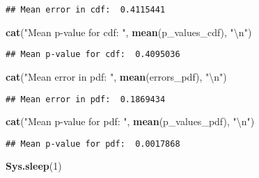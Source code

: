 \documentclass[
]{article}
\newenvironment{Shaded}{\begin{snugshade}}{\end{snugshade}}
\newcommand{\CharTok}[1]{\textcolor[rgb]{0.31,0.60,0.02}{#1}}
\newcommand{\DecValTok}[1]{\textcolor[rgb]{0.00,0.00,0.81}{#1}}
\newcommand{\KeywordTok}[1]{\textcolor[rgb]{0.13,0.29,0.53}{\textbf{#1}}}
\newcommand{\NormalTok}[1]{#1}
\newcommand{\StringTok}[1]{\textcolor[rgb]{0.31,0.60,0.02}{#1}}
\begin{document}
\begin{verbatim}
## Mean error in cdf:  0.4115441
\end{verbatim}

\begin{Shaded}
\begin{Highlighting}[]
\KeywordTok{cat}\NormalTok{(}\StringTok{"Mean p-value for cdf: "}\NormalTok{, }\KeywordTok{mean}\NormalTok{(p_values_cdf), }\StringTok{"}\CharTok{\textbackslash{}n}\StringTok{"}\NormalTok{)}
\end{Highlighting}
\end{Shaded}

\begin{verbatim}
## Mean p-value for cdf:  0.4095036
\end{verbatim}

\begin{Shaded}
\begin{Highlighting}[]
\KeywordTok{cat}\NormalTok{(}\StringTok{"Mean error in pdf: "}\NormalTok{, }\KeywordTok{mean}\NormalTok{(errors_pdf), }\StringTok{"}\CharTok{\textbackslash{}n}\StringTok{"}\NormalTok{)}
\end{Highlighting}
\end{Shaded}

\begin{verbatim}
## Mean error in pdf:  0.1869434
\end{verbatim}

\begin{Shaded}
\begin{Highlighting}[]
\KeywordTok{cat}\NormalTok{(}\StringTok{"Mean p-value for pdf: "}\NormalTok{, }\KeywordTok{mean}\NormalTok{(p_values_pdf), }\StringTok{"}\CharTok{\textbackslash{}n}\StringTok{"}\NormalTok{)}
\end{Highlighting}
\end{Shaded}

\begin{verbatim}
## Mean p-value for pdf:  0.0017868
\end{verbatim}

\begin{Shaded}
\begin{Highlighting}[]
\KeywordTok{Sys.sleep}\NormalTok{(}\DecValTok{1}\NormalTok{)}
\end{Highlighting}
\end{Shaded}
\end{document}
